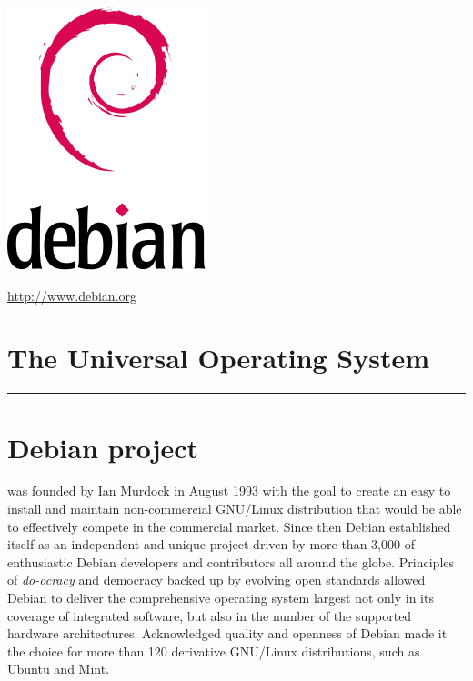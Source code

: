 \documentclass[letterpaper,landscape]{report}
\begin{document}
\begin{multicols}{3}    %

\begin{center}
\noindent
\includegraphics[width=0.5\columnwidth]{openlogo}

\url{http://www.debian.org}

\section*{The Universal Operating System}
\hrule
\end{center}
\vspace{-1em}

\section*{Debian project}
was founded by Ian Murdock in August 1993 with the goal
to create an easy to install and maintain non-commercial GNU/Linux
distribution that would be able to effectively compete in the
commercial market.  Since then Debian established itself as an
independent and unique project driven by more than 3,000 of
enthusiastic Debian developers and contributors all around the globe.
Principles of \emph{do-ocracy} and democracy backed up by evolving open
standards allowed Debian to deliver the comprehensive operating system largest not
only in its coverage of integrated software, but also in the
number of the supported hardware architectures.
Acknowledged quality and openness of Debian made it the choice for
more than 120 derivative GNU/Linux distributions, such as Ubuntu and
Mint.


\end{multicols}
\end{document}
